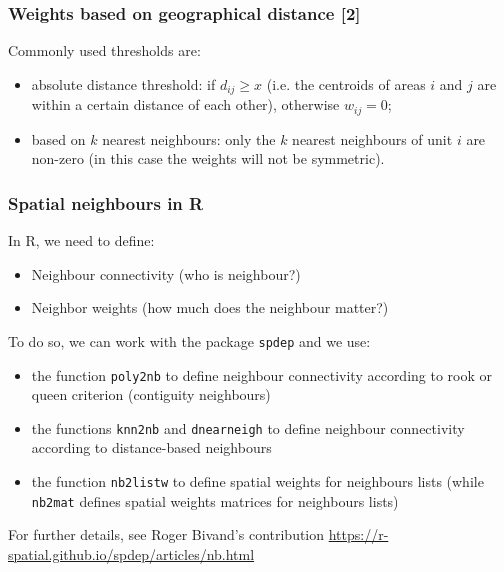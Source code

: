 \documentclass[12pt]{beamer}
\begin{document}
\begin{frame}
\frametitle{Weights based on geographical distance [2]}
Commonly used thresholds are:
\begin{itemize} \setlength\itemsep{\fill}
\item absolute distance threshold: if $d_{ij}\geq x$ (i.e. the centroids of areas $i$ and $j$ are within a certain distance of each other), otherwise $w_{ij}=0$;
\item based on $k$ nearest neighbours: only the $k$ nearest neighbours of unit $i$ are non-zero (in this case the weights will not be symmetric\footnotemark).
\end{itemize}
\end{frame}

\begin{frame}
\frametitle{Spatial neighbours in R}
In R, we need to define:
\begin{itemize} \setlength\itemsep{\fill}
  \item Neighbour connectivity (who is neighbour?)
  \item Neighbor weights (how much does the neighbour matter?)
\end{itemize}
To do so, we can work with the package \texttt{spdep} and we use:
\begin{itemize} \setlength\itemsep{\fill}
\item the function \texttt{poly2nb} to define neighbour connectivity according to rook or queen criterion (contiguity neighbours)
\item the functions \texttt{knn2nb} and \texttt{dnearneigh} to define neighbour connectivity according to distance-based neighbours
\item the function \texttt{nb2listw} to define spatial weights for neighbours lists (while \texttt{nb2mat} defines spatial weights matrices for neighbours lists)
\end{itemize}
    \vspace{10pt}
\tiny{For further details, see Roger Bivand's contribution \url{https://r-spatial.github.io/spdep/articles/nb.html}}
\end{frame}
\end{document}
